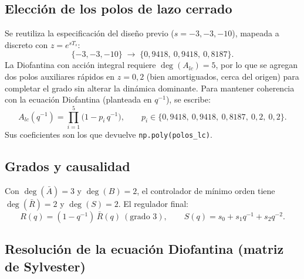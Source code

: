 \documentclass[a4paper,11pt]{report}
\begin{document}
\subsection{Elección de los polos de lazo cerrado}

Se reutiliza la especificación del diseño previo ($s = -3, -3, -10$),
mapeada a discreto con $z = e^{s T_s}$:
\begin{equation}
  \{-3,-3,-10\} \;\to\; \{0{,}9418,\ 0{,}9418,\ 0{,}8187\}.
\end{equation}
La Diofantina con acción integral requiere $\deg(A_{lc}) = 5$, por lo que se
agregan dos polos auxiliares rápidos en $z = 0{,}2$ (bien amortiguados, cerca
del origen) para completar el grado sin alterar la dinámica dominante. Para
mantener coherencia con la ecuación Diofantina (planteada en $q^{-1}$), se
escribe:
\begin{equation}
  A_{lc}(q^{-1}) = \prod_{i=1}^{5}\big(1 - p_i\,q^{-1}\big),
  \qquad p_i \in \{0{,}9418,\ 0{,}9418,\ 0{,}8187,\ 0{,}2,\ 0{,}2\}.
\end{equation}
Sus coeficientes son los que devuelve \texttt{np.poly(polos\_lc)}.

\subsection{Grados y causalidad}

Con $\deg(\bar A) = 3$ y $\deg(B) = 2$, el controlador de mínimo orden tiene
$\deg(\bar R) = 2$ y $\deg(S) = 2$. El regulador final:
\begin{equation}
  R(q) = (1-q^{-1})\,\bar R(q) \ (\text{grado }3), \qquad
  S(q) = s_0 + s_1 q^{-1} + s_2 q^{-2}.
\end{equation}

\subsection{Resolución de la ecuación Diofantina (matriz de Sylvester)}
\end{document}
